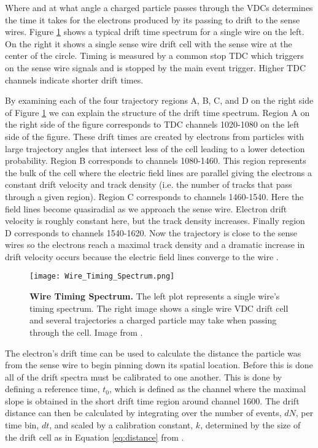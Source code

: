 Where and at what angle a charged particle passes through the VDCs determines the time it takes for the electrons produced by its passing to drift to the sense wires. Figure \ref{fig:drift} shows a typical drift time spectrum for a single wire on the left. On the right it shows a single sense wire drift cell with the sense wire at the center of the circle. Timing is measured by a common stop TDC which triggers on the sense wire signals and is stopped by the main event trigger. Higher TDC channels indicate shorter drift times.

By examining each of the four trajectory regions A, B, C, and D on the right side of Figure \ref{fig:drift} we can explain the structure of the drift time spectrum. Region A on the right side of the figure corresponds to TDC channels 1020-1080 on the left side of the figure. These drift times are created by electrons from particles with large trajectory angles that intersect less of the cell leading to a lower detection probability. Region B corresponds to channels 1080-1460. This region represents the bulk of the cell where the electric field lines are parallel giving the electrons a constant drift velocity and track density (i.e. the number of tracks that pass through a given region). Region C corresponds to channels 1460-1540. Here the field lines become quasiradial as we approach the sense wire. Electron drift velocity is roughly constant here, but the track density increases. Finally region D corresponds to channels 1540-1620. Now the trajectory is close to the sense wires so the electrons reach a maximal track density and a dramatic increase in drift velocity occurs because the electric field lines converge to the wire \cite{Article:VDCs}.

\begin{figure}[!ht]
\begin{center}
\texttt{[image: Wire\_Timing\_Spectrum.png]}
\end{center}
\caption[Wire Timing Spectrum]{
{\bf{Wire Timing Spectrum.}} The left plot represents a single wire's timing spectrum. The right image shows a single wire VDC drift cell and several trajectories a charged particle may take when passing through the cell. Image from \cite{Article:VDCs}.}
\label{fig:drift}
\end{figure}

The electron's drift time can be used to calculate the distance the particle was from the sense wire to begin pinning down its spatial location. Before this is done all of the drift spectra must be calibrated to one another. This is done by defining a reference time, $t_0$, which is defined as the channel where the maximal slope is obtained in the short drift time region around channel 1600. The drift distance can then be calculated by integrating over the number of events, $dN$, per time bin, $dt$, and scaled by a calibration constant, $k$, determined by the size of the drift cell as in Equation \ref{eq:distance} from \cite{Article:VDCs}.

